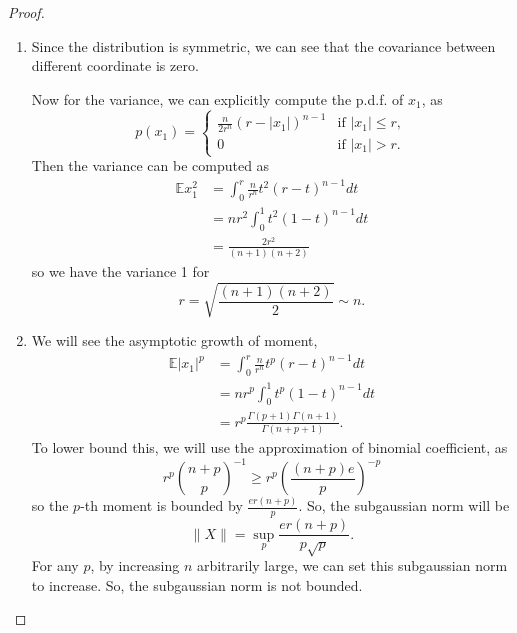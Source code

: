 \documentclass[a4paper]{article}
\newcommand*{\E}{\mathbb{E}}
\begin{document}
\begin{proof}
  \begin{enumerate}
    \item Since the distribution is symmetric, we can see that the covariance between different coordinate is zero.
    
    Now for the variance, we can explicitly compute the p.d.f. of $x_1$, as
    \[
      p(x_1) = \begin{cases}
        \frac{n}{2r^n} (r - |x_1|)^{n-1} & \text{if }|x_1| \le r,
        \\
        0 &\text{if } |x_1| > r.
      \end{cases}
    \]
    Then the variance can be computed as
    \begin{align*}
      \E x_1^2 &= \int_0^r \frac{n}{r^n} t^2 (r - t)^{n-1} dt
      \\
      &= nr^2 \int_0^1 t^2 (1 - t)^{n-1} dt
      \\
      &= \frac{2r^2}{(n+1) (n+2)}
    \end{align*}
    so we have the variance 1 for 
    \[
      r = \sqrt{\frac{(n+1)(n+2)}{2}} \sim n.
    \]
    \item We will see the asymptotic growth of moment, 
    \begin{align*}
      \E |x_1|^p &= \int_0^r \frac{n}{r^n} t^p (r - t)^{n-1} dt
      \\
      &= n r^p  \int_0^1 t^p (1 - t)^{n-1} dt
      \\
      &= r^p \frac{\Gamma(p + 1) \Gamma(n + 1)}{\Gamma(n + p + 1)}.
    \end{align*}
    To lower bound this, we will use the approximation of binomial coefficient, as
    \[
      r^p \binom{n+p}{p}^{-1} \ge r^p \left( \frac{(n + p)e}{p} \right)^{-p}
    \]
    so the $p$-th moment is bounded by $\frac{e r(n+p)}{p}$.
    So, the subgaussian norm will be
    \[
      \|X\| = \sup_p \frac{e r (n + p)}{p \sqrt{p}}.
    \]
    For any $p$, by increasing $n$ arbitrarily large, we can set this subgaussian norm to increase. 
    So, the subgaussian norm is not bounded.
  \end{enumerate}
\end{proof}
\end{document}
